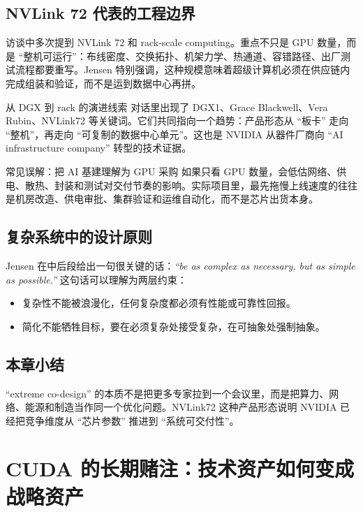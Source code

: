 \documentclass[a4paper]{article}
\begin{document}
\subsection{NVLink 72 代表的工程边界}

访谈中多次提到 NVLink 72 和 rack-scale computing。重点不只是 GPU 数量，而是 ``整机可运行''：布线密度、交换拓扑、机架力学、热通道、容错路径、出厂测试流程都要重写。Jensen 特别强调，这种规模意味着超级计算机必须在供应链内完成组装和验证，而不是运到数据中心再拼。

\begin{knowledgebox}{从 DGX 到 rack 的演进线索}
对话里出现了 DGX1、Grace Blackwell、Vera Rubin、NVLink72 等关键词。它们共同指向一个趋势：产品形态从 ``板卡'' 走向 ``整机''，再走向 ``可复制的数据中心单元''。这也是 NVIDIA 从器件厂商向 ``AI infrastructure company'' 转型的技术证据。
\end{knowledgebox}

\begin{warningbox}{常见误解：把 AI 基建理解为 GPU 采购}
如果只看 GPU 数量，会低估网络、供电、散热、封装和测试对交付节奏的影响。实际项目里，最先拖慢上线速度的往往是机房改造、供电审批、集群验证和运维自动化，而不是芯片出货本身。
\end{warningbox}

\subsection{复杂系统中的设计原则}

Jensen 在中后段给出一句很关键的话：\textit{``be as complex as necessary, but as simple as possible.''} 这句话可以理解为两层约束：
\begin{itemize}
    \item 复杂性不能被浪漫化，任何复杂度都必须有性能或可靠性回报。
    \item 简化不能牺牲目标，要在必须复杂处接受复杂，在可抽象处强制抽象。
\end{itemize}

\subsection{本章小结}

``extreme co-design'' 的本质不是把更多专家拉到一个会议里，而是把算力、网络、能源和制造当作同一个优化问题。NVLink72 这种产品形态说明 NVIDIA 已经把竞争维度从 ``芯片参数'' 推进到 ``系统可交付性''。

\section{CUDA 的长期赌注：技术资产如何变成战略资产}
\end{document}
